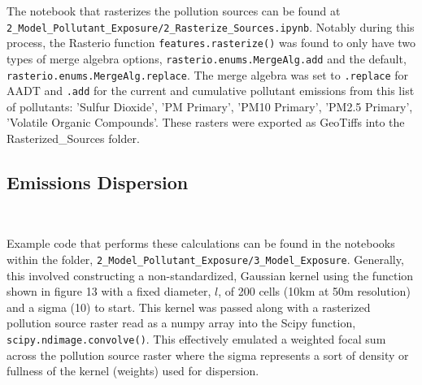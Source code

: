 \documentclass[article,12pt]{article}
\numberwithin{equation}{section}
\begin{document}
The notebook that rasterizes the pollution sources can be found at \newline \texttt{2\_Model\_Pollutant\_Exposure/2\_Rasterize\_Sources.ipynb}. Notably during this process, the Rasterio function \texttt{features.rasterize()} was found to only have two types of merge algebra options, \texttt{rasterio.enums.MergeAlg.add} and the default, \newline \texttt{rasterio.enums.MergeAlg.replace}. The merge algebra was set to \texttt{.replace} for AADT and \texttt{.add} for the current and cumulative pollutant emissions from this list of pollutants: 'Sulfur Dioxide', 'PM Primary', 'PM10 Primary', 'PM2.5 Primary', 'Volatile Organic Compounds'. These rasters were exported as GeoTiffs into the Rasterized\_Sources folder. 

\subsection{Emissions Dispersion}
\begin{adjustwidth}{-.88in}{-.88in}
	\begin{center}
		\\
		
	\end{center}
\end{adjustwidth}
\vspace{.5in}


Example code that performs these calculations can be found in the notebooks within the folder, \texttt{2\_Model\_Pollutant\_Exposure/3\_Model\_Exposure}. Generally, this involved constructing a non-standardized, Gaussian kernel using the function shown in figure 13 with a fixed diameter, $l$, of 200 cells (10km at 50m resolution) and a sigma (10) to start. This kernel was passed along with a rasterized pollution source raster read as a numpy array into the Scipy function, \texttt{scipy.ndimage.convolve()}. This effectively emulated a weighted focal sum across the pollution source raster where the sigma represents a sort of density or fullness of the kernel (weights) used for dispersion. 
\end{document}
